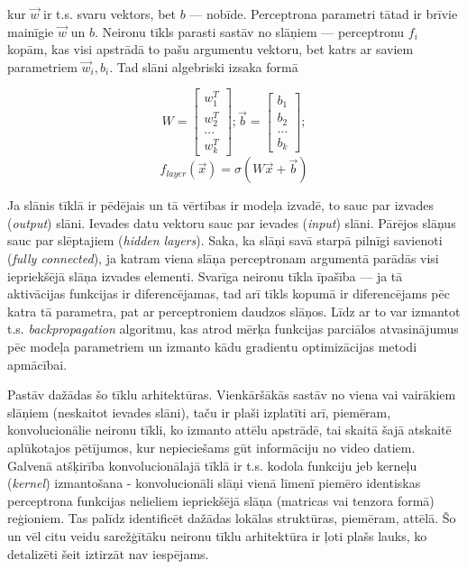 \documentclass[12pt, a4paper]{article}
\numberwithin{equation}{section} %
\begin{document}
kur $\vec{w}$ ir t.s. svaru vektors, bet $b$ ---  nobīde. Perceptrona parametri tātad ir brīvie mainīgie $\vec{w}$ un $b$. Neironu tīkls parasti sastāv no slāņiem --- perceptronu $f_i$ kopām, kas visi apstrādā to pašu argumentu vektoru, bet katrs ar saviem parametriem $\vec{w}_i,b_i$. Tad slāni algebriski izsaka formā

\begin{equation} 
    W = \begin{bmatrix}
        w_1^T \\
        w_2^T \\
        ... \\
        w_k^T
    \end{bmatrix}; 
    \vec{b} =  \begin{bmatrix}
        b_1 \\
        b_2 \\
        ... \\
        b_k
    \end{bmatrix}; 
\end{equation}
\begin{equation} 
    f_{layer}(\vec{x}) = \sigma(W\vec{x}+\vec{b})
\end{equation}

Ja slānis tīklā ir pēdējais un tā vērtības ir modeļa izvadē, to sauc par izvades (\textit{output}) slāni. Ievades datu vektoru sauc par ievades (\textit{input}) slāni. Pārējos slāņus sauc par slēptajiem (\textit{hidden layers}). Saka, ka slāņi savā starpā pilnīgi savienoti (\textit{fully connected}), ja katram viena slāņa perceptronam argumentā parādās visi iepriekšējā slāņa izvades elementi. Svarīga neironu tīkla īpašība --- ja tā aktivācijas funkcijas ir diferencējamas, tad arī tīkls kopumā ir diferencējams pēc katra tā parametra, pat ar perceptroniem daudzos slāņos. Līdz ar to var izmantot t.s. \textit{backpropagation} algoritmu, kas atrod mērķa funkcijas parciālos atvasinājumus pēc modeļa parametriem un izmanto kādu gradientu optimizācijas metodi apmācībai.

Pastāv dažādas šo tīklu arhitektūras. Vienkāršākās sastāv no viena vai vairākiem slāņiem (neskaitot ievades slāni), taču ir plaši izplatīti arī, piemēram, konvolucionālie neironu tīkli\cite{krizhevsky2012imagenet}, ko izmanto attēlu apstrādē, tai skaitā šajā atskaitē aplūkotajos pētījumos, kur nepieciešams gūt informāciju no video datiem. Galvenā atšķirība konvolucionālajā tīklā ir t.s. kodola funkciju jeb kerneļu (\textit{kernel}) izmantošana - konvolucionāli slāņi vienā līmenī piemēro identiskas perceptrona funkcijas nelieliem iepriekšējā slāņa (matricas vai tenzora formā) reģioniem. Tas palīdz identificēt dažādas lokālas struktūras, piemēram, attēlā. Šo un vēl citu veidu sarežģītāku neironu tīklu arhitektūra ir ļoti plašs lauks, ko detalizēti šeit iztirzāt nav iespējams.
\end{document}

